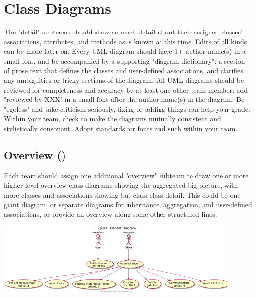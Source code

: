 \documentclass[11pt]{report}
\begin{document}
\chapter{Class Diagrams}
The "detail" subteams should show as much detail about their assigned classes' associations, attributes, and methods as is known at this time. Edits of all kinds can be made later on.
Every UML diagram should have 1+ author name(s) in a small font, and be accompanied by a supporting "diagram dictionary": a section of prose text that defines the classes and user-defined associations, and clarifies any ambiguities or tricky sections of the diagram. All UML diagrams should be reviewed for completeness and accuracy by at least one other team member; add "reviewed by XXX" in a small font after the author name(s) in the diagram. Be "egoless" and take criticism seriously, fixing or adding things can help your grade. Within your team, check to make the diagrams mutually consistent and stylistically consonant. Adopt standards for fonts and such within your team.



\section{Overview ()}
Each team should assign one additional "overview" subteam to draw one or more higher-level overview class diagrams showing the aggregated big picture, with more classes and associations showing but class class detail. This could be one giant diagram, or separate diagrams for inheritance, aggregation, and user-defined associations, or provide an overview along some other structured lines.\newline
    \begin{minipage}{0.9\textwidth}
        \begin{center}
        \includegraphics[width=0.9\textwidth]{diagrams/overview}
        \end{center}
    \end{minipage}
\end{document}
